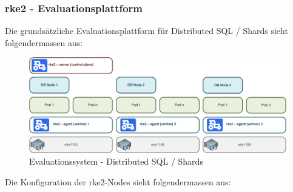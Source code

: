
\begin{flushleft}
    \subsubsection{rke2 - Evaluationsplattform}
    Die grundsätzliche Evaluationsplattform für Distributed SQL / Shards sieht folgendermassen aus:
    \begin{figure}[H]
        \centering
        \includegraphics[width=0.8\linewidth]{source/implementation/evaluation/platforms/evaluation_enviroment_rke2}
        \caption{Evaluationssystem - Distributed SQL / Shards}
        \label{fig:evaluation_enviroment_rke2}
    \end{figure}
    
    Die Konfiguration der \gls{rke2}-Nodes sieht folgendermassen aus:
    
    
\end{flushleft}